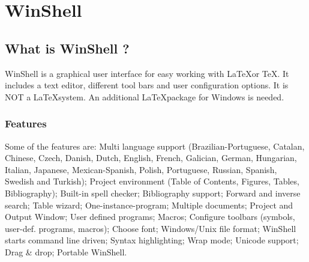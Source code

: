 \chapter{WinShell}
\label{chap2}
\thispagestyle{empty}

\section{What is WinShell ?}
\label{whatisws}

WinShell is a graphical user interface for easy working
with \LaTeX\enspace or \TeX. It includes a text editor, different
tool bars and user configuration options.
It is NOT a \LaTeX\enspace system.
An additional \LaTeX\enspace package for Windows is needed.

\subsection{Features}
\label{features}


Some of the features are:
Multi language support
(Brazilian-Portuguese, Catalan, Chinese, Czech, Danish, Dutch, English, French,
Galician, German, Hungarian, Italian, Japanese, Mexican-Spanish, Polish, Portuguese,
Russian, Spanish, Swedish and Turkish);
Project environment (Table of Contents, Figures, Tables, Bibliography);
Built-in spell checker;
Bibliography support;
Forward and inverse search;
Table wizard;
One-instance-program;
Multiple documents;
Project and Output Window;
User defined programs;
Macros;
Configure toolbars (symbols, user-def. programs, macros);
Choose font;
Windows/Unix file format;
WinShell starts command line driven;
Syntax highlighting;
Wrap mode;
Unicode support;
Drag \& drop;
Portable WinShell.
